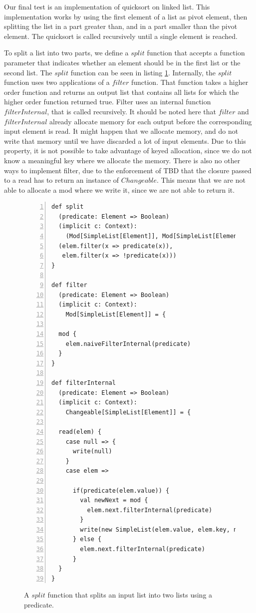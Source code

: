 Our final test is an implementation of quicksort on linked list. This implementation works by using the first element of a list as pivot element, then splitting the list in a part greater than, and in a part smaller than the pivot element. The quicksort is called recursively until a single element is reached.

To split a list into two parts, we define a $split$ function that accepts a function parameter that indicates whether an element should be in the first list or the second list. The $split$ function can be seen in listing \ref{code:split_filter}. Internally, the $split$ function uses two applications of a $filter$ function. That function takes a higher order function and returns an output list that contains all lists for which the higher order function returned true. Filter uses an internal function $filterInternal$, that is called recursively. It should be noted here that $filter$ and $filterInternal$ already allocate memory for each output before the corresponding input element is read. It might happen that we allocate memory, and do not write that memory until we have discarded a lot of input elements. Due to this property, it is not possible to take advantage of keyed allocation, since we do not know a meaningful key where we allocate the memory. There is also no other ways to implement filter, due to the enforcement of TBD that the closure passed to a read has to return an instance of $Changeable$. This means that we are not able to allocate a mod where we write it, since we are not able to return it. 

\begin{figure}
\begin{lstlisting}[frame=single,basicstyle=\ttfamily,numbers=left,mathescape=true]
def split
  (predicate: Element => Boolean)
  (implicit c: Context):
    (Mod[SimpleList[Element]], Mod[SimpleList[Element]]) = {
  (elem.filter(x => predicate(x)), 
   elem.filter(x => !predicate(x)))
}

def filter
  (predicate: Element => Boolean)
  (implicit c: Context):
    Mod[SimpleList[Element]] = {

  mod {
    elem.naiveFilterInternal(predicate)
  }
}

def filterInternal
  (predicate: Element => Boolean)
  (implicit c: Context):
    Changeable[SimpleList[Element]] = {

  read(elem) {
    case null => {
      write(null)
    }
    case elem =>

      if(predicate(elem.value)) {
        val newNext = mod {
          elem.next.filterInternal(predicate)
        }
        write(new SimpleList(elem.value, elem.key, newNext))
      } else {
        elem.next.filterInternal(predicate)
      }
  }
}

\end{lstlisting}
\caption{A $split$ function that splits an input list into two lists using a predicate.}
\label{code:split_filter}
\end{figure}

